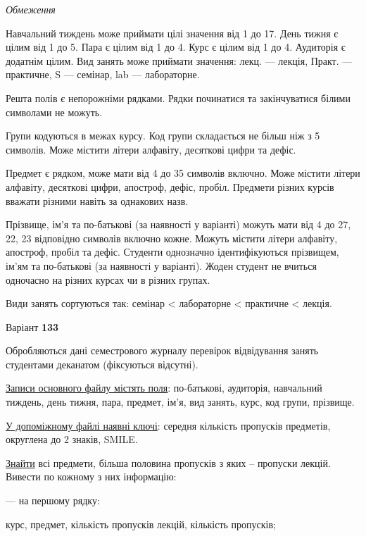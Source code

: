 \documentclass[11pt, ukrainian]{article}
\begin{document}

\bigskip\textit{Обмеження}

Навчальний тиждень може приймати цілі значення від 1 до 17.
День тижня є цілим від 1 до 5. Пара є цілим від 1 до 4.
Курс є цілим від 1 до 4. Аудиторія є додатнім цілим.
Вид занять може приймати значення:
лекц. --- лекція, Практ. --- практичне, S --- семінар, lab --- лабораторне.

Решта полів є непорожніми рядками.
Рядки починатися та закінчуватися білими символами не можуть.

Групи кодуються в межах курсу.
Код групи складається не більш ніж з 5 символів.
Може містити літери алфавіту, десяткові цифри та дефіс.

Предмет є рядком, може мати від 4 до 35 символів включно.
Може містити літери алфавіту, десяткові цифри, апостроф, дефіс, пробіл.
Предмети різних курсів вважати різними навіть за однакових назв.

Прізвище, ім’я та по-батькові (за наявності у варіанті)
можуть мати від 4 до 27, 22, 23 відповідно символів включно кожне.
Можуть містити літери алфавіту, апостроф, пробіл та дефіс.
Студенти однозначно ідентифікуються прізвищем, ім’ям та по-батькові (за наявності у варіанті).
Жоден студент не вчиться одночасно на різних курсах чи в різних групах.

Види занять сортуються так: семінар < лабораторне < практичне < лекція.





\par
\newpage
{\center Варіант  \No \textbf { 133 }\par}
\bigskip
Обробляються дані семестрового журналу перевірок відвідування занять студентами деканатом (фіксуються відсутні). 

\underline{Записи основного файлу містять поля}: по-батькові, аудиторія, навчальний тиждень, день тижня, пара, предмет, ім’я, вид занять, курс, код групи, прізвище.

\underline{У допоміжному файлі наявні ключі}: середня кількість пропусків предметів, округлена до 2 знаків, SMILE.

\underline{Знайти} всі предмети, більша половина пропусків з яких – пропуски лекцій. Вивести по кожному з них інформацію:\par
{\noindent}--- на першому рядку:\par
курс, предмет, кількість пропусків лекцій, кількість пропусків;
\end{document}
